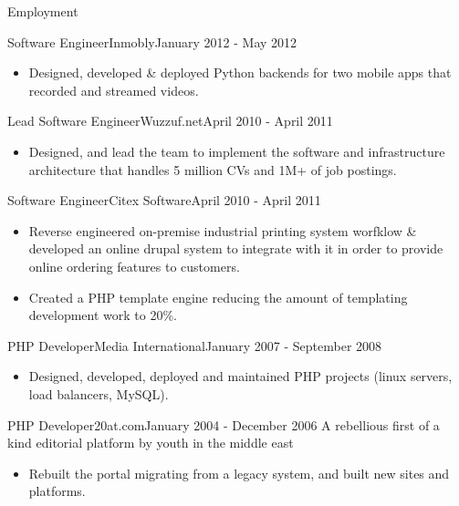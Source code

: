 \documentclass[]{mosabcv}
\begin{document}
\begin{cvsection}{Employment}
  \begin{cvsubsection}{Software Engineer}{Inmobly}{January 2012 - May 2012}
    \begin{itemize}
      \item Designed, developed \& deployed Python backends for two mobile apps that recorded and streamed videos.
    \end{itemize}
  \end{cvsubsection}

  \begin{cvsubsection}{Lead Software Engineer}{Wuzzuf.net}{April 2010 - April 2011}
    \begin{itemize}
      \item Designed, and lead the team to implement the software and infrastructure architecture that handles 5 million CVs and 1M+ of job postings.
    \end{itemize}
  \end{cvsubsection}

  \begin{cvsubsection}{Software Engineer}{Citex Software}{April 2010 - April 2011}
    \begin{itemize}
      \item Reverse engineered on-premise industrial printing system worfklow \& developed an online drupal system to integrate with it in order to provide online ordering features to customers.
      \item Created a PHP template engine reducing the amount of templating development work to 20\%.
    \end{itemize}
  \end{cvsubsection}

  \begin{cvsubsection}{PHP Developer}{Media International}{January 2007 - September 2008}
    \begin{itemize}
      \item Designed, developed, deployed and maintained PHP projects (linux servers, load balancers, MySQL).
    \end{itemize}
  \end{cvsubsection}

  \begin{cvsubsection}{PHP Developer}{20at.com}{January 2004 - December 2006}
    A rebellious first of a kind editorial platform by youth in the middle east
    \begin{itemize}
      \item Rebuilt the portal migrating from a legacy system, and built new sites and platforms.
    \end{itemize}
  \end{cvsubsection}

\end{cvsection}
\end{document}
